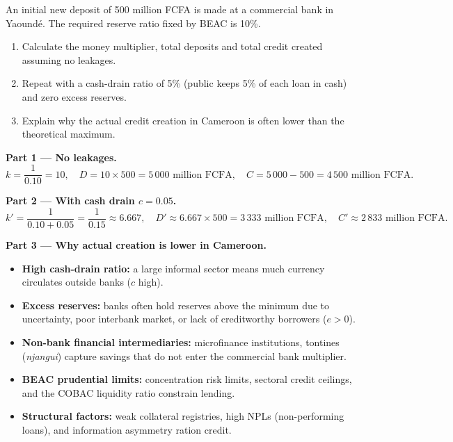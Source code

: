 \documentclass[11pt]{article}
\begin{document}
\begin{exoresolu}
An initial new deposit of 500 million FCFA is made at a commercial bank in Yaoundé. The required reserve ratio fixed by BEAC is 10\%.
\begin{enumerate}
\item Calculate the money multiplier, total deposits and total credit created assuming no leakages.
\item Repeat with a cash-drain ratio of 5\% (public keeps 5\% of each loan in cash) and zero excess reserves.
\item Explain why the actual credit creation in Cameroon is often lower than the theoretical maximum.
\end{enumerate}
\tcblower
\textbf{Part 1 — No leakages.}
\[
k = \frac{1}{0.10} = 10, \quad
D = 10 \times 500 = 5\,000 \text{ million FCFA}, \quad
C = 5\,000 - 500 = 4\,500 \text{ million FCFA}.
\]

\textbf{Part 2 — With cash drain $c = 0.05$.}
\[
k' = \frac{1}{0.10 + 0.05} = \frac{1}{0.15} \approx 6.667, \quad
D' \approx 6.667 \times 500 = 3\,333 \text{ million FCFA}, \quad
C' \approx 2\,833 \text{ million FCFA}.
\]

\textbf{Part 3 — Why actual creation is lower in Cameroon.}
\begin{itemize}
\item \textbf{High cash-drain ratio:} a large informal sector means much currency circulates outside banks ($c$ high).
\item \textbf{Excess reserves:} banks often hold reserves above the minimum due to uncertainty, poor interbank market, or lack of creditworthy borrowers ($e > 0$).
\item \textbf{Non-bank financial intermediaries:} microfinance institutions, tontines (\emph{njangui}) capture savings that do not enter the commercial bank multiplier.
\item \textbf{BEAC prudential limits:} concentration risk limits, sectoral credit ceilings, and the COBAC liquidity ratio constrain lending.
\item \textbf{Structural factors:} weak collateral registries, high NPLs (non-performing loans), and information asymmetry ration credit.
\end{itemize}
\end{exoresolu}
\end{document}
